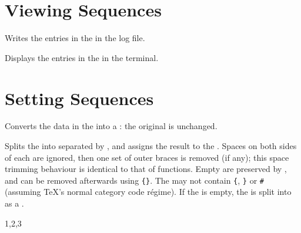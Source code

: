 \documentclass[oneside]{book}
\begin{document}
\section{Viewing Sequences}

\begin{function}{\SeqVarLog}
\begin{syntax}
 
\end{syntax}
Writes the entries in the  in the log file.
\begin{codehigh}
\SeqVarLog \lFooSomeSeq
\end{codehigh}
\end{function}

\begin{function}{\SeqVarShow}
\begin{syntax}
 
\end{syntax}
Displays the entries in the  in the terminal.
\begin{codehigh}
\SeqVarShow \lFooSomeSeq
\end{codehigh}
\end{function}

\section{Setting Sequences}

\begin{function}{\SeqSetFromClist}
\begin{syntax}
  
\end{syntax}
Converts the data in the  into a :
the original  is unchanged.
\begin{demohigh}
\SeqSetFromClist {}
\SeqVarJoin {}
\end{demohigh}
\end{function}

\begin{function}{\SeqSetSplit}
\begin{syntax}
   
\end{syntax}
Splits the  into  separated
by , and assigns the result to the .
Spaces on both sides of each  are ignored,
then one set of outer braces is removed (if any);
this space trimming behaviour is identical to that of
 functions. Empty  are preserved by
, and can be removed afterwards using
  \verb|{}|.
The  may not contain \verb|{|, \verb|}| or \verb|#|
(assuming \TeX{}'s normal category code r\'egime).
If the  is empty, the  is split
into  as a .
\begin{demohigh}
\SeqSetSplit \lTmpaSeq {,} {1,2,3}
\SeqVarJoin {}
\end{demohigh}
\end{function}
\end{document}
